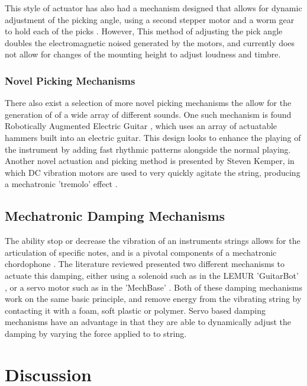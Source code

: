 \documentclass[a4paper,11pt]{article}
\begin{document}
This style of actuator has also had a mechanism designed that allows for dynamic adjustment of the picking angle, using a second stepper motor and a worm gear to hold each of the picks \cite{Carnegie2020}. However, This method of adjusting the pick angle doubles the electromagnetic noised generated by the motors, and currently does not allow for changes of the mounting height to adjust loudness and timbre. 

\subsubsection{Novel Picking Mechanisms}

There also exist a selection of more novel picking mechanisms the allow for the generation of of a wide array of different sounds. One such mechanism is found Robotically Augmented Electric Guitar \cite{Ogata2017}, which uses an array of actuatable hammers built into an electric guitar. This design looks to enhance the playing of the instrument by adding fast rhythmic patterns alongside the normal playing. Another novel actuation and picking method is presented by Steven Kemper, in which DC vibration motors are used to very quickly agitate the string, producing a mechatronic 'tremolo' effect \cite{Kemper2020}.


\subsection{Mechatronic Damping Mechanisms}

The ability stop or decrease the vibration of an instruments strings allows for the articulation of specific notes, and is a pivotal components of a mechatronic chordophone \cite{YepezPlacencia2020}. The literature reviewed presented two different mechanisms to actuate this damping, either using a solenoid such as in the LEMUR 'GuitarBot' \cite{Singer2003}, or a servo motor such as in the 'MechBase' \cite{McVay2015}. 
Both of these damping mechanisms work on the same basic principle, and remove energy from the vibrating string by contacting it with a foam, soft plastic or polymer. Servo based damping mechanisms have an advantage in that they are able to dynamically adjust the damping by varying the force applied to to string.


\section{Discussion}



\newpage


\end{document}
